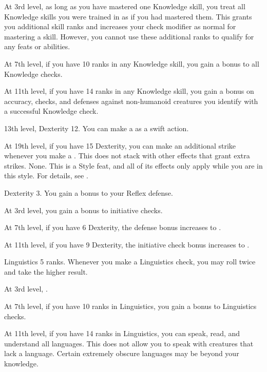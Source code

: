     At 3rd level, as long as you have mastered one Knowledge skill, you treat all Knowledge skills you were trained in as if you had mastered them.
    This grants you additional skill ranks and increases your check modifier as normal for mastering a skill.
    However, you cannot use these additional ranks to qualify for any feats or abilities.

    At 7th level, if you have 10 ranks in any Knowledge skill, you gain a  bonus to all Knowledge checks.

    At 11th level, if you have 14 ranks in any Knowledge skill, you gain a  bonus on accuracy, checks, and defenses against non-humanoid creatures you identify with a successful Knowledge check.

    \featpres 13th level, Dexterity 12.
    \featben You can make a  as a swift action.

    At 19th level, if you have 15 Dexterity, you can make an additional strike whenever you make a .
    This does not stack with other effects that grant extra strikes.
    \stylereq None.
     This is a Style feat, and all of its effects only apply while you are in this style.
    For details, see .

    \featpre Dexterity 3.
    \featben You gain a  bonus to your Reflex defense.

    At 3rd level, you gain a  bonus to initiative checks.

    At 7th level, if you have 6 Dexterity, the defense bonus increases to .

    At 11th level, if you have 9 Dexterity, the initiative check bonus increases to .

    \featpre Linguistics 5 ranks.
    \featben Whenever you make a Linguistics check, you may roll twice and take the higher result.

    At 3rd level, \tdash.

    At 7th level, if you have 10 ranks in Linguistics, you gain a  bonus to Linguistics checks.

    At 11th level, if you have 14 ranks in Linguistics, you can speak, read, and understand all languages.
    This does not allow you to speak with creatures that lack a language.
    Certain extremely obscure languages may be beyond your knowledge.

